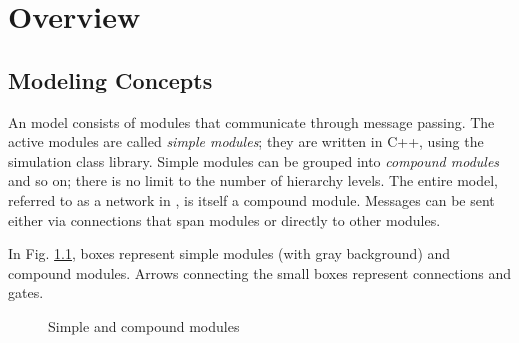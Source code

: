 \chapter{Overview}
\label{cha:overview}


\section{Modeling Concepts}
\label{sec:overview:modeling-concepts}

An {\opp} model consists of modules that communicate through message passing.
The active modules are called \textit{simple modules}; they are written in C++,
using the simulation class library. Simple modules can be grouped into
\textit{compound modules} and so on; there is no limit to the number of hierarchy levels.
The entire model, referred to as a network in {\opp}, is itself a compound module.
Messages can be sent either via connections that span
modules or directly to other modules.

In Fig. \ref{fig:ch-overview:modules}, boxes represent simple modules
(with gray background) and compound modules.
Arrows connecting the small boxes represent connections and gates.

\begin{figure}[htbp]
  \begin{center}
    
    \caption{Simple and compound modules}
    \label{fig:ch-overview:modules}
  \end{center}
\end{figure}



